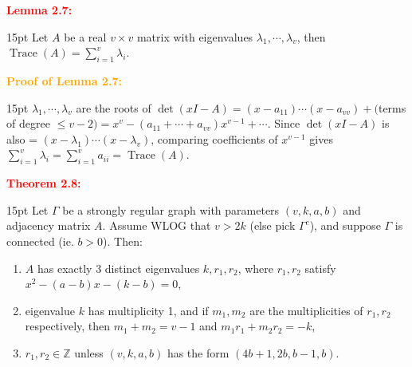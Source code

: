 \documentclass[12pt]{article}
\newcommand{\noparskip}{\vspace{-\parskip}}
\newenvironment{points}
	{\begin{enumerate}[label = (\arabic*)]}
	{\end{enumerate}}
\newenvironment{dent}
	{\begin{adjustwidth}{15pt}{}\noparskip}
	{\end{adjustwidth}}
\newenvironment{result}[1]
	{\textcolor{Red}{\textbf{#1:}}\begin{dent}}
	{\end{dent}}
\newenvironment{proof}[1]
	{\textcolor{Orange}{\textbf{Proof of #1:}}\begin{dent}}
	{\end{dent}}
\newcommand{\Z}{\mathbb{Z}}
\newcommand{\trace}[1]{\operatorname{Trace}(#1)}
\begin{document}
\begin{result}{Lemma 2.7}
Let $A$ be a real $v \times v$ matrix with eigenvalues $\lambda_1, \cdots, \lambda_v$, then $\trace{A} = \sum_{i = 1}^v \lambda_i$.
\end{result}

\begin{proof}{Lemma 2.7}
$\lambda_1, \cdots, \lambda_v$ are the roots of $\det (xI - A) = (x - a_{11}) \cdots (x - a_{vv}) + ($terms of degree $\le v - 2) = x^v - (a_{11} + \cdots + a_{vv}) x^{v - 1} + \cdots$. Since $\det (xI - A)$ is also = $(x - \lambda_1) \cdots (x - \lambda_v)$, comparing coefficients of $x^{v - 1}$ gives $\sum_{i = 1}^v \lambda_i = \sum_{i = 1}^v a_{ii} = \trace{A}$.
\end{proof}

\begin{result}{Theorem 2.8}
Let $\Gamma$ be a strongly regular graph with parameters $(v, k, a, b)$ and adjacency matrix $A$. Assume WLOG that $v > 2k$ (else pick $\Gamma^c$), and suppose $\Gamma$ is connected (ie. $b > 0$). Then:
\noparskip
\begin{points}
\item $A$ has exactly 3 distinct eigenvalues $k, r_1, r_2$, where $r_1, r_2$ satisfy $x^2 - (a - b)x - (k - b) = 0$,
\item eigenvalue $k$ has multiplicity 1, and if $m_1, m_2$ are the multiplicities of $r_1, r_2$ respectively, then $m_1 + m_2 = v - 1$ and $m_1 r_1 + m_2 r_2 = -k$,
\item $r_1, r_2 \in \Z$ unless $(v, k, a, b)$ has the form $(4b + 1, 2b, b - 1, b)$.
\end{points}
\end{result}
\end{document}
